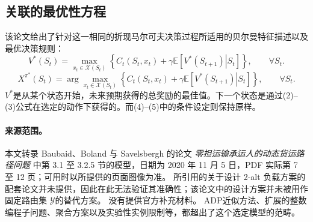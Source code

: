 \documentclass{article}
\begin{document}
\subsection*{关联的最优性方程}
该论文给出了针对这一相同的折现马尔可夫决策过程所适用的贝尔曼特征描述以及最优决策规则：
\begin{equation}
V^*(S_t)=\max_{x_t\in\mathcal{X}(S_t)}
\left\{C_t(S_t,x_t)+\gamma\mathbb{E}\left[
\left.V^*(S_{t+1})\right|S_t\right]\right\},
\qquad\forall S_t.
\tag{4}
\end{equation}
\begin{equation}
X^{\pi^*}(S_t)=\arg\max_{x_t\in\mathcal{X}(S_t)}
\left\{C_t(S_t,x_t)+\gamma\mathbb{E}\left[
\left.V^*(S_{t+1})\right|S_t\right]\right\},
\qquad\forall S_t.
\tag{5}
\end{equation}
$V^*$是从某个状态开始，未来预期获得的总奖励的最佳值。下一个状态是通过(2)--(3)公式在选定的动作下获得的。而(4)--(5)中的条件设定则保持原样。

\paragraph{来源范围。}
本文转录 Baubaid、Boland 与 Savelsbergh 的论文 \emph{零担运输承运人的动态货运路径问题} 中第 3.1 至 3.2.5 节的模型，日期为 2020 年 11 月 5 日，PDF 实际第 7 至 12 页；可用时以所提供的页面图像为准。 所引用的关于设计 2-alt 负载方案的配套论文并未提供，因此在此无法验证其准确性；该论文中的设计方案并未被用作固定路由集 $\mathcal{Y}$的替代方案。 没有提供官方补充材料。 ADP近似方法、扩展的整数编程子问题、聚合方案以及实验性实例限制等，都超出了这个选定模型的范畴。
\end{document}

